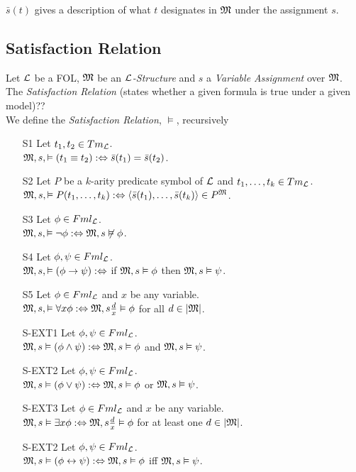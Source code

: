 \documentclass[11pt,a4paper]{article}
\begin{document}
$\bar{s}(t)$ gives a description of what $t$ designates in $\mathfrak{M}$ under the assignment $s$.

\subsection{Satisfaction Relation}

Let $\mathcal{L}$ be a FOL, $\mathfrak{M}$ be an \textit{$\mathcal{L}$-Structure} and $s$ a \textit{Variable Assignment} over $\mathfrak{M}$.\\
The \textit{Satisfaction Relation} (states whether a given formula is true under a given model)??\\
We define the \textit{Satisfaction Relation}, $\vDash$, recursively
\begin{itemize}
	\item[S1] Let $t_1,t_2\in Tm_{\mathcal{L}}$.\\
	$\mathfrak{M},s,\vDash (t_1\equiv t_2):\Leftrightarrow\bar{s}(t_1)=\bar{s}(t_2)$.
	\item[S2] Let $P$ be a $k$-arity predicate symbol of $\mathcal{L}$ and $t_1,\dots,t_k\in Tm_{\mathcal{L}}$.\\
	$\mathfrak{M},s,\vDash P(t_1,\dots,t_k):\Leftrightarrow\langle\bar{s}(t_1),\dots,\bar{s}(t_k)\rangle\in P^{\mathfrak{M}}$.
	\item[S3] Let $\phi\in Fml_{\mathcal{L}}$.\\
	$\mathfrak{M},s,\vDash \neg\phi:\Leftrightarrow\mathfrak{M},s\not\vDash\phi$.
	\item[S4] Let $\phi,\psi\in Fml_{\mathcal{L}}$.\\
	$\mathfrak{M},s,\vDash (\phi\to\psi):\Leftrightarrow$ if $\mathfrak{M},s\vDash\phi$ then $\mathfrak{M},s\vDash\psi$.
	\item[S5] Let $\phi\in Fml_{\mathcal{L}}$ and $x$ be any variable.\\
	$\mathfrak{M},s,\vDash \forall x\phi:\Leftrightarrow\mathfrak{M},s\frac{d}{x}\vDash\phi$ for all $d\in|\mathfrak{M}|$.
	\item[S-EXT1]Let $\phi,\psi\in Fml_{\mathcal{L}}$.\\
	$\mathfrak{M},s\vDash(\phi\wedge\psi):\Leftrightarrow\mathfrak{M},s\vDash\phi$ and $\mathfrak{M},s\vDash\psi$.
	\item[S-EXT2]Let $\phi,\psi\in Fml_{\mathcal{L}}$.\\
	$\mathfrak{M},s\vDash(\phi\vee\psi):\Leftrightarrow\mathfrak{M},s\vDash\phi$ or $\mathfrak{M},s\vDash\psi$.
	\item[S-EXT3]Let $\phi\in Fml_{\mathcal{L}}$ and $x$ be any variable.\\
	$\mathfrak{M},s\vDash\exists x\phi:\Leftrightarrow\mathfrak{M},s\frac{d}x\vDash\phi$ for at least one $d\in|\mathfrak{M}|$.
	\item[S-EXT2]Let $\phi,\psi\in Fml_{\mathcal{L}}$.\\
	$\mathfrak{M},s\vDash(\phi\leftrightarrow\psi):\Leftrightarrow\mathfrak{M},s\vDash\phi$ iff $\mathfrak{M},s\vDash\psi$.
\end{itemize}
\end{document}
